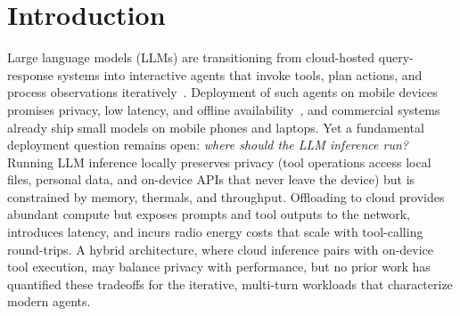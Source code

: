 \documentclass[sigconf,anonymous,review]{acmart}
\begin{document}


\maketitle

\section{Introduction}
\label{sec:introduction}

Large language models (LLMs) are transitioning from cloud-hosted query-response systems into interactive agents that invoke tools, plan actions, and process observations iteratively~\cite{li-2025-review,10606356}.
Deployment of such agents on mobile devices promises privacy, low latency, and offline availability~\cite{8876870}, and commercial systems already ship small models on mobile phones and laptops.
Yet a fundamental deployment question remains open: \emph{where should the LLM inference run?}
Running LLM inference locally preserves privacy (tool operations access local files, personal data, and on-device APIs that never leave the device) but is constrained by memory, thermals, and throughput.
Offloading to cloud provides abundant compute but exposes prompts and tool outputs to the network, introduces latency, and incurs radio energy costs that scale with tool-calling round-trips.
A hybrid architecture, where cloud inference pairs with on-device tool execution, may balance privacy with performance, but no prior work has quantified these tradeoffs for the iterative, multi-turn workloads that characterize modern agents.
\end{document}
